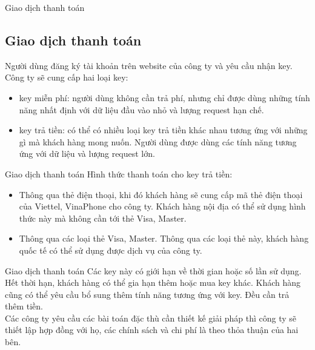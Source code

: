 \documentclass{beamer}
\begin{document}
\begin{frame}{Giao dịch thanh toán}
\subsection{Giao dịch thanh toán}
Người dùng đăng ký tài khoản trên website của công ty và yêu cầu nhận key.\\
Công ty sẽ cung cấp hai loại key:
\begin{itemize}
\item key miễn phí: người dùng không cần trả phí, nhưng chỉ được dùng những tính năng nhất định với dữ liệu đầu vào nhỏ và lượng request hạn chế.
\item key trả tiền: có thể có nhiều loại key trả tiền khác nhau tương ứng với những gì mà khách hàng mong nuốn. Người dùng được dùng các tính năng tương ứng với dữ liệu và lượng request lớn. 
\end{itemize}
\end{frame}
\begin{frame}{Giao dịch thanh toán}
Hình thức thanh toán cho key trả tiền: \\
\begin{itemize}
\item Thông qua thẻ điện thoại, khi đó khách hàng sẽ cung cấp mã thẻ điện thoại của Viettel, VinaPhone cho công ty. Khách hàng nội địa có thể sử dụng hình thức này mà không cần tới thẻ Visa, Master.
\item Thông qua các loại thẻ Visa, Master. Thông qua các loại thẻ này, khách hàng quốc tế có thể sử dụng được dịch vụ của công ty.

\end{itemize}


\end{frame}
\begin{frame}{Giao dịch thanh toán}
Các key này có giới hạn về thời gian hoặc số lần sử dụng. Hết thời hạn, khách hàng có thể gia hạn thêm hoặc mua key khác. Khách hàng cũng có thể yêu cầu bổ sung thêm tính năng tương ứng với key. Đều cần trả thêm tiền.\\

Các công ty yêu cầu các bài toán đặc thù cần thiết kế giải pháp thì công ty sẽ thiết lập hợp đồng với họ, các chính sách và chi phí là theo thỏa thuận của hai bên.

\end{frame}
\end{document}
